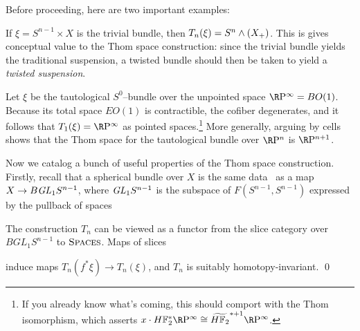 Before proceeding, here are two important examples:
\begin{example}\label{TrivialBundleThomExample}
If \(\xi = S^{n-1} \times X\) is the trivial bundle, then \(T_n(\xi) = S^n \wedge (X_+)\).  This is gives conceptual value to the Thom space construction: since the trivial bundle yields the traditional suspension, a twisted bundle should then be taken to yield a \textit{twisted suspension}.
\end{example}

\begin{example}\label{RPnThomExample}
Let \(\xi\) be the tautological \(S^0\)--bundle over the unpointed space \(\RP^\infty = BO(1)\).  Because its total space \(EO(1)\) is contractible, the cofiber degenerates, and it follows that \(T_1(\xi) = \RP^\infty\) as pointed spaces.\footnote{If you already know what's coming, this should comport with the Thom isomorphism, which asserts \(x \cdot \HFtwo^* \RP^\infty \cong \widetilde{\HFtwo}^{* + 1} \RP^\infty\).}  More generally, arguing by cells shows that the Thom space for the tautological bundle over \(\RP^n\) is \(\RP^{n+1}\).
\end{example}

Now we catalog a bunch of useful properties of the Thom space construction.  Firstly, recall that a spherical bundle over \(X\) is the same data~\cite{MayClassifyingSpaces} as a map \(X \to B \mathit{GL}_1 S^{n-1}\), where \(\mathit{GL}_1 S^{n-1}\) is the subspace of \(F(S^{n-1}, S^{n-1})\) expressed by the pullback of spaces
\begin{center}
\end{center}

\begin{lemma}\label{ThomConstructionIsASliceFunctor}
The construction \(T_n\) can be viewed as a functor from the slice category over \(BGL_1 S^{n-1}\) to \(\normalfont\textsc{Spaces}\).  Maps of slices
\begin{center}
\end{center}
induce maps \(T_n(f^* \xi) \to T_n(\xi)\), and \(T_n\) is suitably homotopy-invariant. \qed
\end{lemma}

